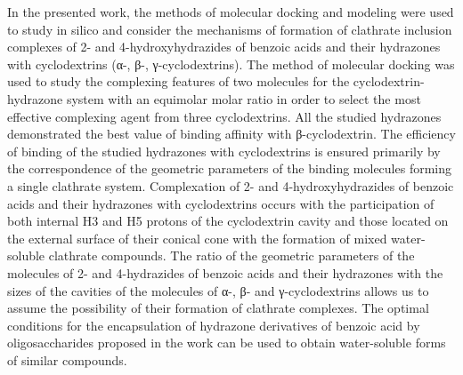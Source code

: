 In the presented work, the methods of molecular docking and modeling
were used to study in silico and consider the mechanisms of formation of
clathrate inclusion complexes of 2- and 4-hydroxyhydrazides of benzoic
acids and their hydrazones with cyclodextrins (α-, β-, γ-cyclodextrins).
The method of molecular docking was used to study the complexing
features of two molecules for the cyclodextrin-hydrazone system with an
equimolar molar ratio in order to select the most effective complexing
agent from three cyclodextrins. All the studied hydrazones demonstrated
the best value of binding affinity with β-cyclodex\-trin. The efficiency
of binding of the studied hydrazones with cyclodextrins is ensured
primarily by the correspondence of the geometric parameters of the
binding molecules forming a single clathrate system. Complexation of 2-
and 4-hydroxyhydrazides of benzoic acids and their hydrazones with
cyclodextrins occurs with the participation of both internal H3 and H5
protons of the cyclodextrin cavity and those located on the external
surface of their conical cone with the formation of mixed water-soluble
clathrate compounds. The ratio of the geometric parameters of the
molecules of 2- and 4-hydrazides of benzoic acids and their hydrazones
with the sizes of the cavities of the molecules of α-, β- and
γ-cyclodextrins allows us to assume the possibility of their formation
of clathrate complexes. The optimal conditions for the encapsulation of
hydrazone derivatives of benzoic acid by oligosaccharides proposed in
the work can be used to obtain water-soluble forms of similar compounds.

